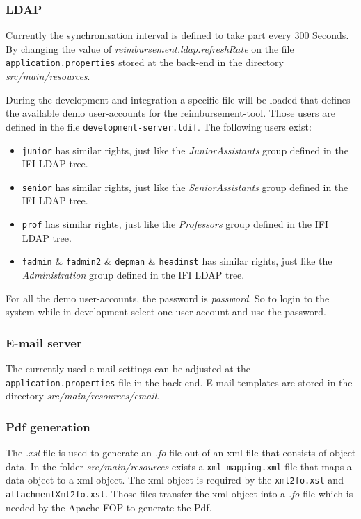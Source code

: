 \subsubsection{LDAP}
\label{subsubsec:ldap}

Currently the synchronisation interval is defined to take part every 300 Seconds. By changing the value of \textit{reimbursement.ldap.refreshRate} on the file \texttt{application.properties} stored at the back-end in the directory \textit{src/main/resources}. \par
During the development and integration a specific file will be loaded that defines the available demo user-accounts for the reimbursement-tool. Those users are defined in the file \texttt{development-server.ldif}. The following users exist:
\begin{itemize}
\item \texttt{junior} has similar rights, just like the \textit{JuniorAssistants} group defined in the IFI LDAP tree.
\item \texttt{senior} has similar rights, just like the \textit{SeniorAssistants} group defined in the IFI LDAP tree.
\item \texttt{prof} has similar rights, just like the \textit{Professors} group defined in the IFI LDAP tree.
\item \texttt{fadmin} \& \texttt{fadmin2} \& \texttt{depman} \& \texttt{headinst} has similar rights, just like the \textit{Administration} group defined in the IFI LDAP tree.
\end{itemize}

For all the demo user-accounts, the password is \textit{password}. So to login to the system while in development select one user account and use the password. 

\subsubsection{E-mail server}
\label{subsubsec:email}

The currently used e-mail settings can be adjusted at the \texttt{application.properties} file in the back-end. E-mail templates are stored in the directory \textit{src/main/resources/email}.

\subsubsection{Pdf generation}
\label{subsubsec:pdf-xml-mappings}

The \textit{.xsl} file is used to generate an \textit{.fo} file out of an xml-file that consists of object data. In the folder \textit{src/main/resources} exists a \texttt{xml-mapping.xml} file that maps a data-object to a xml-object. The xml-object is required by the \texttt{xml2fo.xsl} and \texttt{attachmentXml2fo.xsl}. Those files transfer the xml-object into a \textit{.fo} file which is needed by the Apache FOP to generate the Pdf.  


